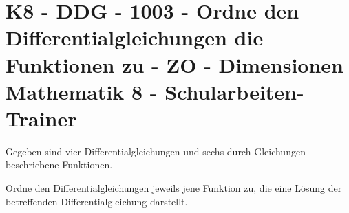 \section{K8 - DDG - 1003 - Ordne den Differentialgleichungen die Funktionen zu - ZO - Dimensionen Mathematik 8 - Schularbeiten-Trainer}

\begin{beispiel}[K8 - DDG]{1}
Gegeben sind vier Differentialgleichungen und sechs durch Gleichungen beschriebene Funktionen.

Ordne den Differentialgleichungen jeweils jene Funktion zu, die eine Lösung der betreffenden Differentialgleichung darstellt.

\end{beispiel}